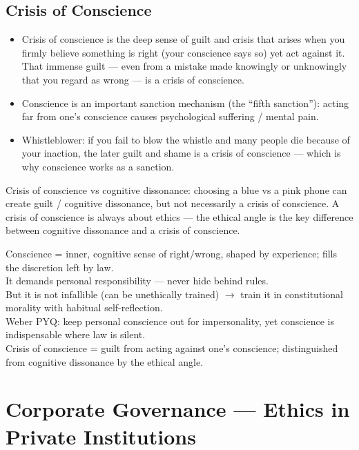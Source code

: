 \subsection{Crisis of Conscience}
\begin{KeyConcept}
\begin{itemize}
\item Crisis of conscience is the deep sense of guilt and crisis that arises when you firmly believe something is right (your conscience says so) yet act against it. That immense guilt --- even from a mistake made knowingly or unknowingly that you regard as wrong --- is a crisis of conscience.
\item Conscience is an important sanction mechanism (the ``fifth sanction''): acting far from one's conscience causes psychological suffering / mental pain.
\item Whistleblower: if you fail to blow the whistle and many people die because of your inaction, the later guilt and shame is a crisis of conscience --- which is why conscience works as a sanction.
\end{itemize}
\end{KeyConcept}

\begin{ComparisonBox}
Crisis of conscience vs cognitive dissonance: choosing a blue vs a pink phone can create guilt / cognitive dissonance, but not necessarily a crisis of conscience. A crisis of conscience is always about ethics --- the ethical angle is the key difference between cognitive dissonance and a crisis of conscience.
\end{ComparisonBox}

\begin{QuickRevision}
Conscience = inner, cognitive sense of right/wrong, shaped by experience; fills the discretion left by law.\\
It demands personal responsibility --- never hide behind rules.\\
But it is not infallible (can be unethically trained) $\rightarrow$ train it in constitutional morality with habitual self-reflection.\\
Weber PYQ: keep personal conscience out for impersonality, yet conscience is indispensable where law is silent.\\
Crisis of conscience = guilt from acting against one's conscience; distinguished from cognitive dissonance by the ethical angle.
\end{QuickRevision}

\section{Corporate Governance --- Ethics in Private Institutions}

